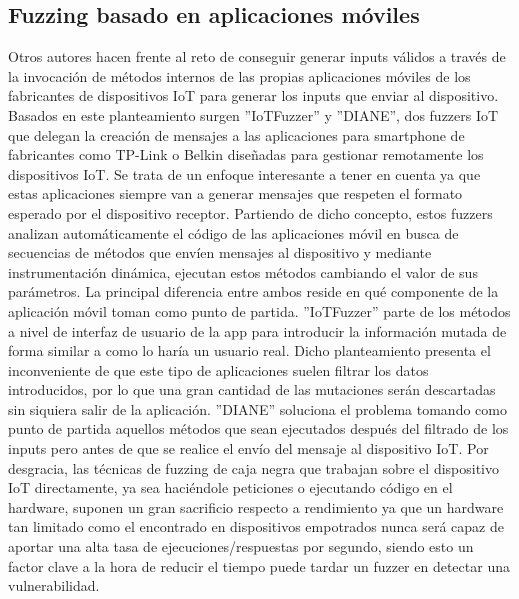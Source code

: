 \subsection{Fuzzing basado en aplicaciones móviles}
Otros autores hacen frente al reto de conseguir generar inputs 
válidos a través de la invocación de métodos internos de las propias aplicaciones móviles de los fabricantes de dispositivos IoT para generar los 
inputs que enviar al dispositivo.
Basados en este planteamiento surgen ''IoTFuzzer''\cite{Chen2018} y ''DIANE''\cite{Redini2021}, dos fuzzers IoT que delegan la creación de mensajes 
a las aplicaciones para smartphone de fabricantes como TP-Link o Belkin diseñadas para gestionar remotamente los dispositivos IoT. 
Se trata de un enfoque interesante a tener en cuenta ya que estas aplicaciones siempre van a generar mensajes que respeten el formato esperado
por el dispositivo receptor. Partiendo de dicho concepto, estos fuzzers analizan automáticamente el código de las aplicaciones móvil en busca de secuencias de 
métodos que envíen mensajes al dispositivo y mediante instrumentación dinámica, ejecutan estos métodos cambiando el valor de sus parámetros. La principal diferencia 
entre ambos reside en qué componente de la aplicación móvil toman como punto de partida. ''IoTFuzzer'' parte de los métodos a nivel de interfaz de usuario de la app
para introducir la información mutada de forma similar a como lo haría un usuario real. Dicho planteamiento presenta el inconveniente de que este tipo 
de aplicaciones suelen filtrar los datos introducidos, por lo que una gran cantidad de las mutaciones serán descartadas sin siquiera salir de la aplicación.
''DIANE'' soluciona el problema tomando como punto de partida aquellos métodos que sean ejecutados después del filtrado de los inputs pero antes de
que se realice el envío del mensaje al dispositivo IoT. Por desgracia, las técnicas de fuzzing de caja negra que trabajan sobre el dispositivo IoT
directamente, ya sea haciéndole peticiones o ejecutando código en el hardware, suponen un gran sacrificio respecto a rendimiento ya que un hardware 
tan limitado como el encontrado en dispositivos empotrados nunca será capaz de aportar una alta tasa de ejecuciones/respuestas por segundo, siendo esto un 
factor clave a la hora de reducir el tiempo puede tardar un fuzzer en detectar una vulnerabilidad.

